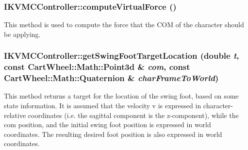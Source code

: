 \hypertarget{classCartWheel_1_1Core_1_1IKVMCController_a8f7b679c31e3caf15c6499d50179f023}{
\subsubsection[{computeVirtualForce}]{ IKVMCController::computeVirtualForce ()}}
\label{classCartWheel_1_1Core_1_1IKVMCController_a8f7b679c31e3caf15c6499d50179f023}
This method is used to compute the force that the COM of the character should be applying. \hypertarget{classCartWheel_1_1Core_1_1IKVMCController_aa9be3a191f084f2bfbf1c766be3386f0}{
\subsubsection[{getSwingFootTargetLocation}]{ IKVMCController::getSwingFootTargetLocation (double {\em t}, \/  const {\bf CartWheel::Math::Point3d} \& {\em com}, \/  const {\bf CartWheel::Math::Quaternion} \& {\em charFrameToWorld})}}
\label{classCartWheel_1_1Core_1_1IKVMCController_aa9be3a191f084f2bfbf1c766be3386f0}
This method returns a target for the location of the swing foot, based on some state information. It is assumed that the velocity v is expressed in character-\/relative coordinates (i.e. the sagittal component is the z-\/component), while the com position, and the initial swing foot position is expressed in world coordinates. The resulting desired foot position is also expressed in world coordinates.

